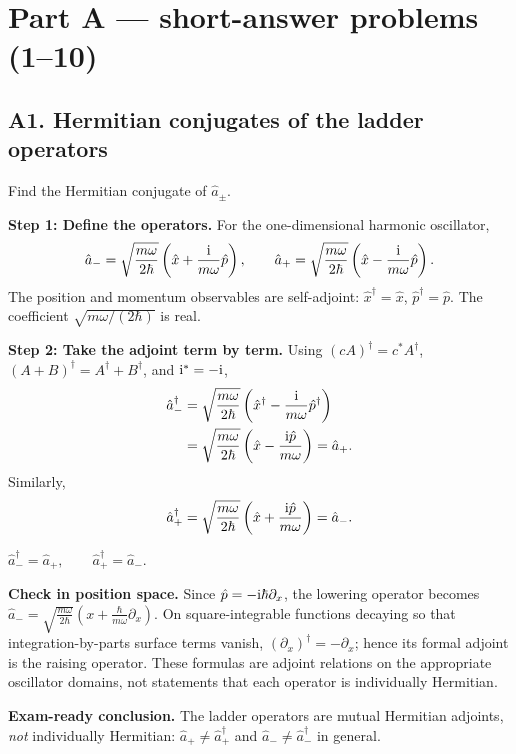 \documentclass[11pt,a4paper]{article}
\newcommand{\key}[1]{\begin{resultbox}\centering\(\displaystyle #1\)\end{resultbox}}
\begin{document}
\section{Part A --- short-answer problems (1--10)}

\subsection{A1. Hermitian conjugates of the ladder operators}
\begin{questionbox}
Find the Hermitian conjugate of \(\hat a_\pm\).
\end{questionbox}
\textbf{Step 1: Define the operators.} For the one-dimensional harmonic oscillator,
\begin{equation}
\hat a_- = \sqrt{\frac{m\omega}{2\hbar}}\left(\hat x+\frac{\mathrm{i}}{m\omega}\hat p\right),\qquad
\hat a_+ = \sqrt{\frac{m\omega}{2\hbar}}\left(\hat x-\frac{\mathrm{i}}{m\omega}\hat p\right).
\end{equation}
The position and momentum observables are self-adjoint: \(\hat x^\dagger=\hat x\), \(\hat p^\dagger=\hat p\). The coefficient \(\sqrt{m\omega/(2\hbar)}\) is real.

\textbf{Step 2: Take the adjoint term by term.} Using \((cA)^\dagger=c^*A^\dagger\), \((A+B)^\dagger=A^\dagger+B^\dagger\), and \(\mathrm{i}^*=-\mathrm{i}\),
\begin{align}
\hat a_-^\dagger
&=\sqrt{\frac{m\omega}{2\hbar}}\left(\hat x^\dagger-\frac{\mathrm{i}}{m\omega}\hat p^\dagger\right)\\
&=\sqrt{\frac{m\omega}{2\hbar}}\left(\hat x-\frac{\mathrm{i}\hat p}{m\omega}\right)=\hat a_+.
\end{align}
Similarly,
\begin{equation}
\hat a_+^\dagger=\sqrt{\frac{m\omega}{2\hbar}}\left(\hat x+\frac{\mathrm{i}\hat p}{m\omega}\right)=\hat a_-.
\end{equation}
\key{\boxed{\hat a_-^\dagger=\hat a_+,\qquad\hat a_+^\dagger=\hat a_-.}}
\textbf{Check in position space.} Since \(\hat p=-\mathrm{i}\hbar\partial_x\), the lowering operator becomes \(\hat a_-=\sqrt{\frac{m\omega}{2\hbar}}\left(x+\frac{\hbar}{m\omega}\partial_x\right)\). On square-integrable functions decaying so that integration-by-parts surface terms vanish, \((\partial_x)^\dagger=-\partial_x\); hence its formal adjoint is the raising operator. These formulas are adjoint relations on the appropriate oscillator domains, not statements that each operator is individually Hermitian.

\textbf{Exam-ready conclusion.} The ladder operators are mutual Hermitian adjoints, \emph{not} individually Hermitian: \(\hat a_+\neq \hat a_+^\dagger\) and \(\hat a_-\neq\hat a_-^\dagger\) in general.
\end{document}
